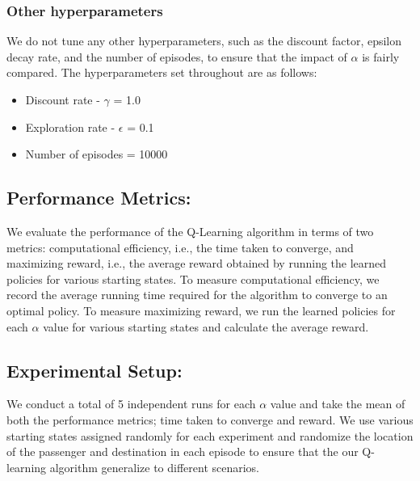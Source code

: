 \documentclass[conference]{IEEEtran}
\begin{document}
\subsubsection{Other hyperparameters}
We do not tune any other hyperparameters, such as the discount factor, epsilon decay rate, and the number of episodes, to ensure that the impact of $\alpha$ is fairly compared. The hyperparameters set throughout are as follows: 
\begin{itemize}
    \item Discount rate - $\gamma$ = 1.0
    \item Exploration rate - $\epsilon$ = 0.1
    \item Number of episodes = 10000
    \newline
\end{itemize} 

\subsection{Performance Metrics:}
We evaluate the performance of the Q-Learning algorithm in terms of two metrics: computational efficiency, i.e., the time taken to converge, and maximizing reward, i.e., the average reward obtained by running the learned policies for various starting states. To measure computational efficiency, we record the average running time required for the algorithm to converge to an optimal policy. To measure maximizing reward, we run the learned policies for each $\alpha$ value for various starting states and calculate the average reward. 

\subsection{Experimental Setup:}
We conduct a total of 5 independent runs for each $\alpha$ value and take the mean of both the performance metrics; time taken to converge and reward. We use various starting states assigned randomly for each experiment and randomize the location of the passenger and destination in each episode to ensure that the our Q-learning algorithm generalize to different scenarios. 
\end{document}
